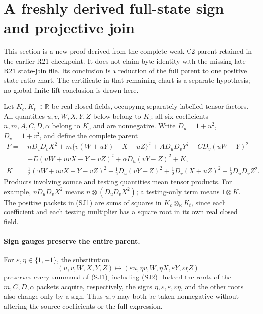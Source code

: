 \section{A freshly derived full-state sign and projective join}
\label{sec:rederived-state-join}

This section is a new proof derived from the complete weak-C2 parent retained
in the earlier R21 checkpoint.  It does not claim byte identity with the
missing late-R21 state-join file.  Its conclusion is a reduction of the full
parent to one positive state-ratio chart.  The certificate in that remaining
chart is a separate hypothesis; no global finite-lift conclusion is drawn
here.

Let $K_c,K_t\supset\mathbb R$ be real closed fields, occupying separately
labelled tensor factors.  All quantities $u,v,W,X,Y,Z$ below belong to $K_t$;
all six coefficients $n,m,A,C,D,\alpha$ belong to $K_c$ and are nonnegative.
Write $D_u=1+u^2$, $D_v=1+v^2$, and define the complete parent
\begin{align}
 F={}&nD_uD_vX^2+m\{v(W+uY)-X-uZ\}^2
       +AD_uD_vY^2+CD_v(uW-Y)^2\\
    &+D(uW+uvX-Y-vZ)^2+\alpha D_u(vY-Z)^2+K,\tag{SJ1}\\
 K={}&\tfrac12(uW+uvX-Y-vZ)^2
       +\tfrac12D_u(vY-Z)^2
       +\tfrac12D_v(X+uZ)^2-\tfrac12D_uD_vZ^2.\tag{SJ2}
\end{align}
Products involving source and testing quantities mean tensor products.
For example, $nD_uD_vX^2$ means
$n\otimes(D_uD_vX^2)$; a testing-only term means $1\otimes K$.
The positive packets in (SJ1) are sums of squares in
$K_c\otimes_{\mathbb R}K_t$, since each coefficient and each testing
multiplier has a square root in its own real closed field.

\paragraph{Sign gauges preserve the entire parent.}
For $\varepsilon,\eta\in\{1,-1\}$, the substitution
\[
 (u,v,W,X,Y,Z)\longmapsto
 (\varepsilon u,\eta v,W,\eta X,\varepsilon Y,
  \varepsilon\eta Z)                                      \tag{SJ3}
\]
preserves every summand of (SJ1), including (SJ2).  Indeed the roots of the
$m,C,D,\alpha$ packets acquire, respectively, the signs
$\eta,\varepsilon,\varepsilon,\varepsilon\eta$, and the other roots also
change only by a sign.  Thus $u,v$ may both be taken nonnegative without
altering the source coefficients or the full expression.

